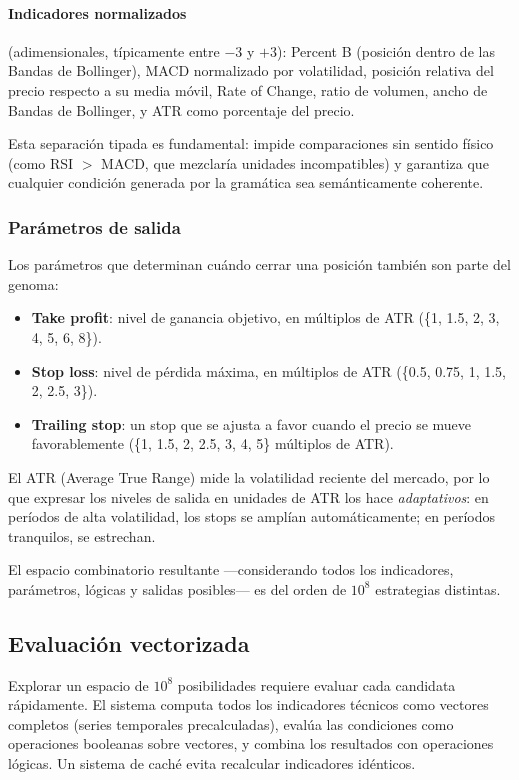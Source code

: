 \documentclass[12pt,a4paper]{article}
\begin{document}
\paragraph{Indicadores normalizados} (adimensionales, típicamente entre $-3$ y $+3$):
Percent B (posición dentro de las Bandas de Bollinger), MACD normalizado por
volatilidad, posición relativa del precio respecto a su media móvil, Rate of Change,
ratio de volumen, ancho de Bandas de Bollinger, y ATR como porcentaje del precio.

Esta separación tipada es fundamental: impide comparaciones sin sentido físico (como
RSI $>$ MACD, que mezclaría unidades incompatibles) y garantiza que cualquier
condición generada por la gramática sea semánticamente coherente.

\subsubsection{Parámetros de salida}

Los parámetros que determinan cuándo cerrar una posición también son parte del genoma:

\begin{itemize}
\item \textbf{Take profit}: nivel de ganancia objetivo, en múltiplos de ATR
  (\{1, 1.5, 2, 3, 4, 5, 6, 8\}).
\item \textbf{Stop loss}: nivel de pérdida máxima, en múltiplos de ATR
  (\{0.5, 0.75, 1, 1.5, 2, 2.5, 3\}).
\item \textbf{Trailing stop}: un stop que se ajusta a favor cuando el precio se
  mueve favorablemente (\{1, 1.5, 2, 2.5, 3, 4, 5\} múltiplos de ATR).
\end{itemize}

El ATR (Average True Range) mide la volatilidad reciente del mercado, por lo que
expresar los niveles de salida en unidades de ATR los hace \textit{adaptativos}: en
períodos de alta volatilidad, los stops se amplían automáticamente; en períodos
tranquilos, se estrechan.

El espacio combinatorio resultante ---considerando todos los indicadores, parámetros,
lógicas y salidas posibles--- es del orden de $10^8$ estrategias distintas.

\subsection{Evaluación vectorizada}
\label{sec:vectorized}

Explorar un espacio de $10^8$ posibilidades requiere evaluar cada candidata
rápidamente. El sistema computa todos los indicadores técnicos como vectores completos
(series temporales precalculadas), evalúa las condiciones como operaciones booleanas
sobre vectores, y combina los resultados con operaciones lógicas. Un sistema de caché
evita recalcular indicadores idénticos.
\end{document}
